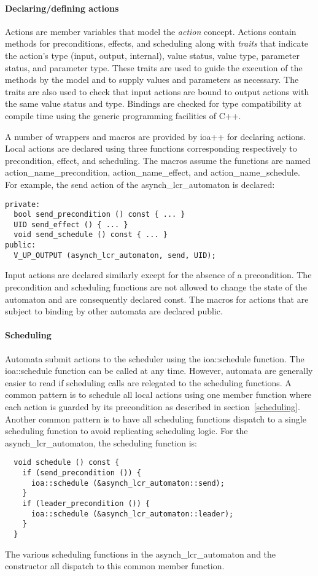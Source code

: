 \paragraph*{Declaring/defining actions}
Actions are member variables that model the \emph{action} concept.
Actions contain methods for preconditions, effects, and scheduling along with \emph{traits} that indicate the action's type (input, output, internal), value status, value type, parameter status, and parameter type.
These traits are used to guide the execution of the methods by the model and to supply values and parameters as necessary.
The traits are also used to check that input actions are bound to output actions with the same value status and type.
Bindings are checked for type compatibility at compile time using the generic programming facilities of C++.

A number of wrappers and macros are provided by ioa++ for declaring actions.
Local actions are declared using three functions corresponding respectively to precondition, effect, and scheduling.
The macros assume the functions are named action\_name\_precondition, action\_name\_effect, and action\_name\_schedule.
\ifjournal
For example, the send action of the asynch\_lcr\_automaton is declared:
\begin{lstlisting}
private:
  bool send_precondition () const { ... }
  UID send_effect () { ... }
  void send_schedule () const { ... }
public:
  V_UP_OUTPUT (asynch_lcr_automaton, send, UID);
\end{lstlisting}
\fi
Input actions are declared similarly except for the absence of a precondition.
The precondition and scheduling functions are not allowed to change the state of the automaton and are consequently declared const.
The macros for actions that are subject to binding by other automata are declared public.

\paragraph*{Scheduling}
Automata submit actions to the scheduler using the ioa::schedule function.
The ioa::schedule function can be called at any time.
However, automata are generally easier to read if scheduling calls are relegated to the scheduling functions.
A common pattern is to schedule all local actions using one member function where each action is guarded by its precondition as described in section~\ref{scheduling}.
Another common pattern is to have all scheduling functions dispatch to a single scheduling function to avoid replicating scheduling logic.
\ifjournal
For the asynch\_lcr\_automaton, the scheduling function is:
\begin{lstlisting}
  void schedule () const {
    if (send_precondition ()) {
      ioa::schedule (&asynch_lcr_automaton::send);
    }
    if (leader_precondition ()) {
      ioa::schedule (&asynch_lcr_automaton::leader);
    }
  }
\end{lstlisting}
The various scheduling functions in the asynch\_lcr\_automaton and the constructor all dispatch to this common member function.
\fi

